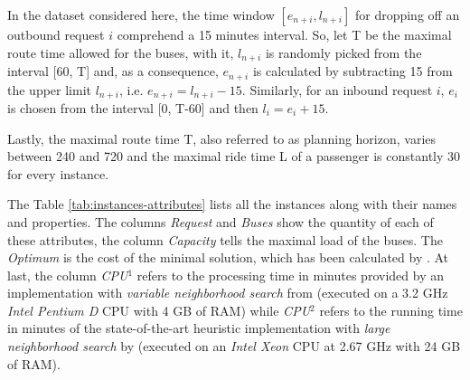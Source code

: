 \documentclass[tuberlin,cic,tc,openright,english,noabntcite,oneside]{iiufrgs}
\begin{document}
In the dataset considered here, the time window $[e_{n+i}, l_{n+i}]$ for dropping off an outbound request $i$ comprehend a 15 minutes interval. So, let T be the maximal route time allowed for the buses, with it, $l_{n+i}$ is randomly picked from the interval [60, T] and, as a consequence, $e_{n+i}$ is calculated by subtracting 15 from the upper limit $l_{n+i}$, i.e. $e_{n+i} = l_{n+i} - 15$. Similarly, for an inbound request $i$, $e_i$ is chosen from the interval [0, T-60] and then $l_i = e_i + 15$.

Lastly, the maximal route time T, also referred to as planning horizon, varies between 240 and 720 and the maximal ride time L of a passenger is constantly 30 for every instance.

The Table \ref{tab:instances-attributes} lists all the instances along with their names and properties. The columns \emph{Request} and \emph{Buses} show the quantity of each of these attributes, the column \emph{Capacity} tells the maximal load of the buses. The \emph{Optimum} is the cost of the minimal solution, which has been calculated by \textcite[p. 270]{ropke_models_2007}. At last, the column \emph{CPU$^1$} refers to the processing time in minutes provided by an implementation with \emph{variable neighborhood search} from \textcite{parragh_introducing_2011} (executed on a 3.2 GHz \emph{Intel Pentium D} CPU with 4 GB of RAM) while \emph{CPU$^2$} refers to the running time in minutes of the state-of-the-art heuristic implementation with \emph{large neighborhood search} by \textcite{parragh_hybrid_2013} (executed on an \emph{Intel Xeon} CPU at 2.67 GHz with 24 GB of RAM).
\end{document}

